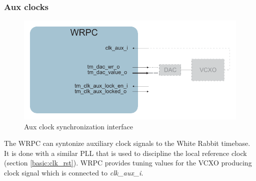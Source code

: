 \subsubsection{Aux clocks}

\begin{figure}[ht]
  \begin{center}
    \includegraphics[width=.8\textwidth]{fig/adv_wrpc_clk.pdf}
    \caption{Aux clock synchronization interface}
  \end{center}
\end{figure}

The WRPC can syntonize auxiliary clock signals to the White Rabbit timebase. It
is done with a similar PLL that is used to discipline the local reference clock
(section \ref{basic:clk_rst}). WRPC provides tuning values for the VCXO producing
clock signal which is connected to \emph{clk\_aux\_i}.

\begin{hdlporttable}
\end{hdlporttable}
